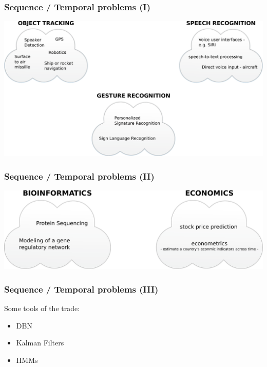 
\begin{frame}
  \frametitle{Sequence / Temporal problems (I)}
  \includegraphics[width=\textwidth]{images/time_series_problems_1.pdf}
\end{frame}

\begin{frame}
  \frametitle{Sequence / Temporal problems (II)}
  \includegraphics[width=\textwidth]{images/time_series_problems_2.pdf}
\end{frame}

\begin{frame}
  \frametitle{Sequence / Temporal problems (III)}
  Some tools of the trade:
  
  \begin{itemize}
  	\item DBN
  	\item Kalman Filters
  	\item HMMs
  \end{itemize}
\end{frame}


